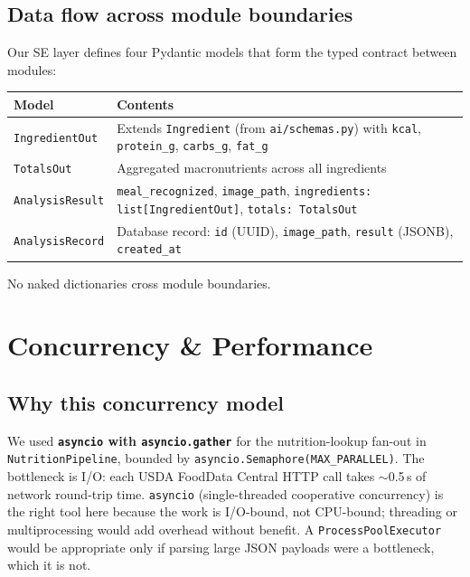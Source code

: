 \documentclass[11pt,a4paper]{article}
\begin{document}
\subsection{Data flow across module boundaries}

Our SE layer defines four Pydantic models that form the typed contract between modules:

\begin{center}\small
\begin{tabularx}{\textwidth}{@{} l X @{}}
\toprule
\textbf{Model} & \textbf{Contents} \\
\midrule
\texttt{IngredientOut}  & Extends \texttt{Ingredient} (from \texttt{ai/schemas.py}) with \texttt{kcal}, \texttt{protein\_g}, \texttt{carbs\_g}, \texttt{fat\_g} \\
\texttt{TotalsOut}      & Aggregated macronutrients across all ingredients \\
\texttt{AnalysisResult} & \texttt{meal\_recognized}, \texttt{image\_path}, \texttt{ingredients: list[IngredientOut]}, \texttt{totals: TotalsOut} \\
\texttt{AnalysisRecord} & Database record: \texttt{id} (UUID), \texttt{image\_path}, \texttt{result} (JSONB), \texttt{created\_at} \\
\bottomrule
\end{tabularx}
\end{center}

No naked dictionaries cross module boundaries.

\section{Concurrency \& Performance}\label{sec:concurrency}

\subsection{Why this concurrency model}

We used \textbf{\texttt{asyncio} with \texttt{asyncio.gather}} for the nutrition-lookup fan-out in \texttt{NutritionPipeline}, bounded by \texttt{asyncio.Semaphore(MAX\_PARALLEL)}.
The bottleneck is I/O: each USDA FoodData Central HTTP call takes $\sim$0.5\,s of network round-trip time.
\texttt{asyncio} (single-threaded cooperative concurrency) is the right tool here because the work is I/O-bound, not CPU-bound; threading or multiprocessing would add overhead without benefit.
A \texttt{ProcessPoolExecutor} would be appropriate only if parsing large JSON payloads were a bottleneck, which it is not.
\end{document}
